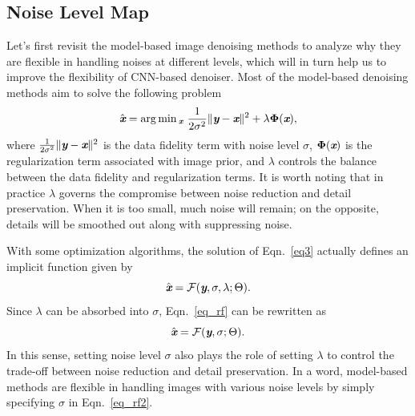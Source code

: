 \documentclass[journal]{IEEEtran}
\begin{document}
\subsection{Noise Level Map}
Let's first revisit the model-based image denoising methods to analyze why they are flexible in handling noises at different levels, which will in turn help us to improve the flexibility of CNN-based denoiser. Most of the model-based denoising methods aim to solve the following problem
\begin{equation}\label{eq3}
  \hat{\emph{\textbf{x}}} = \mathop{\arg\min}\displaystyle_{\emph{\textbf{x}}} ~ \frac{1}{2\sigma^2}\|\emph{\textbf{y}} - \emph{\textbf{x}}\|^2 + \lambda \mathbf{\Phi}(\emph{\textbf{x}}),
\end{equation}
where $\frac{1}{2\sigma^2}\|\emph{\textbf{y}} - \emph{\textbf{x}}\|^2$ is the data fidelity term with noise level $\sigma$,
$\mathbf{\Phi}(\emph{\textbf{x}})$ is the regularization term associated with image prior, and $\lambda$ controls the balance between the data fidelity and regularization terms. It is worth noting that in practice $\lambda$ governs the compromise between noise reduction and detail preservation. When it is too small, much noise will remain; on the opposite, details will be smoothed out along with suppressing noise.


{With some optimization algorithms, the solution of Eqn.~\eqref{eq3} actually defines an implicit function given by
\begin{equation}\label{eq_rf}
\hat{\emph{\textbf{x}}} = \mathcal{F}(\emph{\textbf{y}}, \sigma, \lambda; \Theta).
\end{equation}
Since $\lambda$ can be absorbed into $\sigma$, Eqn.~\eqref{eq_rf} can be rewritten as
\begin{equation}\label{eq_rf2}
\hat{\emph{\textbf{x}}} = \mathcal{F}(\emph{\textbf{y}}, \sigma; \Theta).
\end{equation}}
In this sense, setting noise level $\sigma$ also plays the role of setting $\lambda$ to control the trade-off between noise reduction and detail preservation. In a word, model-based methods are flexible in handling images with various noise levels by simply specifying $\sigma$ in Eqn.~\eqref{eq_rf2}.
\end{document}
